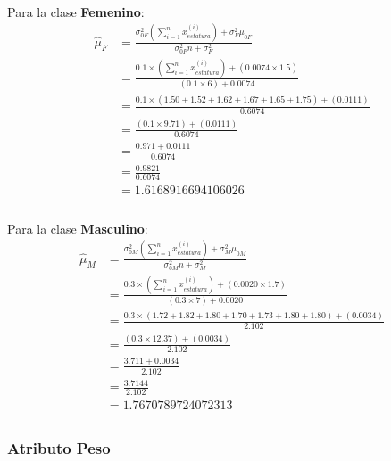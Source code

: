 \documentclass[12pt]{article}
\begin{document}
 \paragraph{} Para la clase \textbf{Femenino}:
 \begin{equation}
 \begin{split}
 \hat{\mu}_{F}&=\frac{\sigma_{0F}^2(\sum_{i=1}^{n}{x_{estatura}^{(i)}}) + \sigma_F^2\mu_{0F} }{\sigma_{0F}^2n + \sigma_F^2}\\
 &=\frac{0.1\times(\sum_{i=1}^{n}{x_{estatura}^{(i)}}) + (0.0074\times 1.5) }{(0.1 \times 6) + 0.0074}\\
 &=\frac{0.1\times(1.50 + 1.52 + 1.62 + 1.67 + 1.65 + 1.75) + (0.0111) }{0.6074}\\
 &=\frac{(0.1\times 9.71) + (0.0111) }{0.6074}\\
 &=\frac{0.971 + 0.0111 }{0.6074}\\
 &=\frac{0.9821}{0.6074}\\
 &= 1.6168916694106026\\
 \end{split}
 \end{equation}
\paragraph{} Para la clase \textbf{Masculino}:
\begin{equation}
\begin{split}
\hat{\mu}_{M}&=\frac{\sigma_{0M}^2(\sum_{i=1}^{n}{x_{estatura}^{(i)}}) + \sigma_M^2\mu_{0M} }{\sigma_{0M}^2n + \sigma_M^2}\\
&=\frac{0.3\times(\sum_{i=1}^{n}{x_{estatura}^{(i)}}) + (0.0020\times 1.7) }{(0.3 \times 7) + 0.0020}\\
&=\frac{0.3\times(1.72 + 1.82 + 1.80 + 1.70 + 1.73 + 1.80 + 1.80) + (0.0034) }{2.102}\\
&=\frac{(0.3\times 12.37) + (0.0034) }{2.102}\\
&=\frac{3.711 + 0.0034 }{2.102}\\
&=\frac{3.7144}{2.102}\\
&= 1.7670789724072313\\
\end{split}
\end{equation}
 \subsubsection{Atributo Peso}
\end{document}
